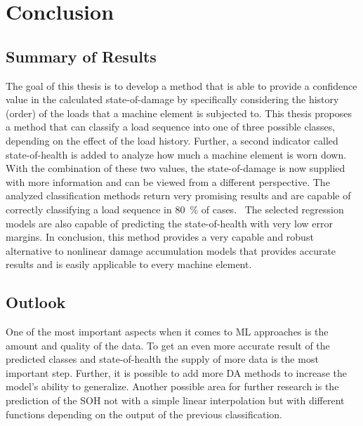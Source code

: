 \chapter{Conclusion}\label{conc}
\section{Summary of Results}
The goal of this thesis is to develop a method that is able to provide a confidence value in the calculated state-of-damage by specifically considering the history (order) of the loads that a machine element is subjected to. This thesis proposes a method that can classify a load sequence into one of three possible classes, depending on the effect of the load history. Further, a second indicator called state-of-health is added to analyze how much a machine element is worn down. With the combination of these two values, the state-of-damage is now supplied with more information and can be viewed from a different perspective. The analyzed classification methods return very promising results and are capable of correctly classifying a load sequence in 80~\% of cases. 
The selected regression models are also capable of predicting the state-of-health with very low error margins.
In conclusion, this method provides a very capable and robust alternative to nonlinear damage accumulation models that provides accurate results and is easily applicable to every machine element.  
\section{Outlook}
One of the most important aspects when it comes to ML approaches is the amount and quality of the data. To get an even more accurate result of the predicted classes and state-of-health the supply of more data is the most important step. Further, it is possible to add more DA methods to increase the model's ability to generalize. Another possible area for further research is the prediction of the SOH not with a simple linear interpolation but with different functions depending on the output of the previous classification.
